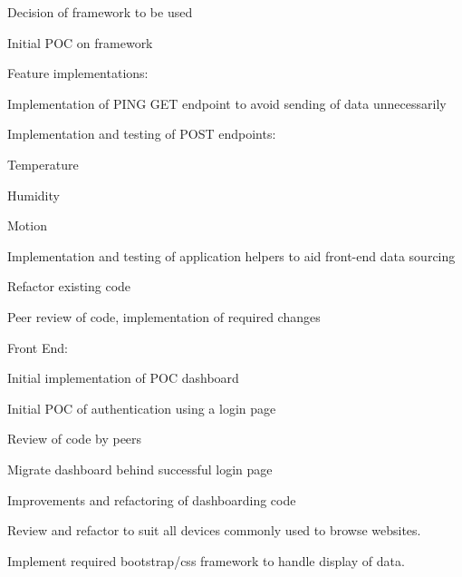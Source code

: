 \documentclass{article}
\begin{document}
\begin{legal}
\begin{legal}
                    \item Decision of framework to be used
                    \item Initial POC on framework
                    \item Feature implementations: 
                    \begin{legal}
                        \item Implementation of PING GET endpoint to avoid sending of data unnecessarily
                        \item Implementation and testing of POST endpoints:
                        \begin{legal}
                            \item Temperature
                            \item Humidity
                            \item Motion
                        \end{legal}
                        \item Implementation and testing of application helpers to aid front-end data sourcing
                    \end{legal}
                    \item Refactor existing code
                    \begin{legal}
                        \item Peer review of code, implementation of required changes
                    \end{legal}
                \end{legal}
                \item Front End:
                \begin{legal}
                    \item Initial implementation of POC dashboard
                    \item Initial POC of authentication using a login page
                    \item Review of code by peers
                    \item Migrate dashboard behind successful login page
                    \item Improvements and refactoring of dashboarding code
                    \item Review and refactor to suit all devices commonly used to browse websites.
                    \item Implement required bootstrap/css framework to handle display of data.

\end{legal}
\end{legal}
\end{document}
